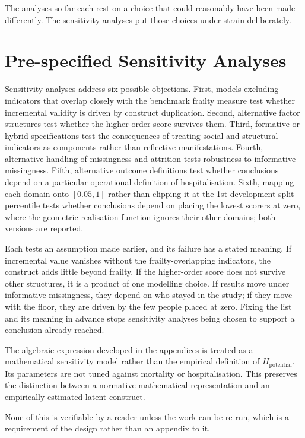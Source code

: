 The analyses so far each rest on a choice that could reasonably have been made differently. The sensitivity analyses put those choices under strain deliberately.

\section{Pre-specified Sensitivity Analyses}
\label{sec:sensitivity}

Sensitivity analyses address six possible objections. First, models excluding indicators that overlap closely with the benchmark frailty measure test whether incremental validity is driven by construct duplication. Second, alternative factor structures test whether the higher-order score survives them. Third, formative or hybrid specifications test the consequences of treating social and structural indicators as components rather than reflective manifestations. Fourth, alternative handling of missingness and attrition tests robustness to informative missingness. Fifth, alternative outcome definitions test whether conclusions depend on a particular operational definition of hospitalisation. Sixth, mapping each domain onto $[0.05,1]$ rather than clipping it at the 1st development-split percentile tests whether conclusions depend on placing the lowest scorers at zero, where the geometric realisation function ignores their other domains; both versions are reported.

Each tests an assumption made earlier, and its failure has a stated meaning. If incremental value vanishes without the frailty-overlapping indicators, the construct adds little beyond frailty. If the higher-order score does not survive other structures, it is a product of one modelling choice. If results move under informative missingness, they depend on who stayed in the study; if they move with the floor, they are driven by the few people placed at zero. Fixing the list and its meaning in advance stops sensitivity analyses being chosen to support a conclusion already reached.

The algebraic expression developed in the appendices is treated as a mathematical sensitivity model rather than the empirical definition of $H_{\text{potential}}$. Its parameters are not tuned against mortality or hospitalisation. This preserves the distinction between a normative mathematical representation and an empirically estimated latent construct.

None of this is verifiable by a reader unless the work can be re-run, which is a requirement of the design rather than an appendix to it.

